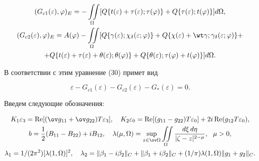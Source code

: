 \begin{gather} 


(G_{c1}(\varepsilon),\varphi)_E=-\iint\limits_\Omega 


[Q\{t(\varepsilon)+\tau(\varepsilon);\tau(\varphi)\} 


+Q\{\tau(\varepsilon);t(\varphi)\}]d\Omega,\notag \\ 


% 


(G_{c2}(\varepsilon),\varphi)_E=A(\varphi) 


-\iint\limits_\Omega [Q\{\gamma(\varepsilon); 


\chi_\delta(\varepsilon;\varphi)\}+ 


Q\{\chi(\varepsilon)+\wt\gamma;\gamma_\delta 


(\varepsilon;\varphi)\} +\notag \\ 


% 


+Q\{t(\varepsilon)+\tau(\varepsilon)+\theta(\varepsilon); 


\theta(\varphi)\}+Q\{\theta(\varepsilon);\tau(\varphi)+ 


t(\varphi)\}]d\Omega. 


\end{gather} 


В соответствии с этим уравнение (30) примет вид 


\begin{equation} 


\varepsilon-G_{c1}(\varepsilon)-G_{c2}(\varepsilon)- 


G_*(\varepsilon)=0. 


\end{equation} 


 


Введем следующие обозначения: 


\begin{gather*} 


K_1\varepsilon_3=\re[(\ov g_{11}+\ov g_{22})T\varepsilon_3],\quad 


K_2\varepsilon_0=\re[(g_{11}-g_{22})T\varepsilon_0]+ 


2i\re(g_{12}T\varepsilon_0), \\ 


% 


b=\frac{1}{2}(B_{11}-B_{22})+i B_{12},\quad 


\lambda(\mu,\Omega)=\sup_{z\in \ov\Omega}\iint\limits_\Omega 


\frac{d\xi\,d\eta}{|\zeta-z|^{2-\mu}},\ \ \mu>0, \\ 


% 


\lambda_1=1/(2\pi^2)[\lambda(1,\Omega)]^2,\quad 


\lambda_2=\|\beta_1-i\beta_2\|_C +\|\beta_1+i\beta_2\|_C+ 


(1/\pi)\lambda(1,\Omega)\|g_1+g_2\|_C. 


\end{gather*} 





